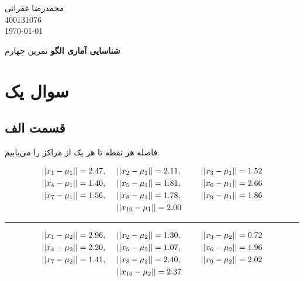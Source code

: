 \documentclass[12pt, a4paper]{article}
\newcommand{\coursetitle}{شناسایی آماری الگو}
\newcommand{\doctitle}{تمرین چهارم}
\newcommand{\name}{محمدرضا غفرانی}
\newcommand{\studentno}{400131076}
\newcommand{\todaydate}{\today}
\begin{document}
\begin{flushleft}
    \name \\
    \studentno \\
    \todaydate
\end{flushleft}

\begin{center}
    \huge
    \textbf{\coursetitle}
    \break
    \large
    \doctitle
\end{center}

\thispagestyle{plain}

\noindent

\section*{سوال یک}

\subsection*{قسمت الف}

فاصله هر نقطه تا هر یک از مراکز را می‌یابیم.

\begin{eqnarray*}
    ||x_1 - \mu_1|| = 2.47, & \hspace{.5cm} ||x_2 - \mu_1|| = 2.11, & \hspace{.5cm} ||x_3 - \mu_1|| = 1.52 \\
    ||x_4 - \mu_1|| = 1.40, & \hspace{.5cm} ||x_5 - \mu_1|| = 1.81, & \hspace{.5cm} ||x_6 - \mu_1|| = 2.66 \\
    ||x_7 - \mu_1|| = 1.56, & \hspace{.5cm} ||x_8 - \mu_1|| = 1.78, & \hspace{.5cm} ||x_9 - \mu_1|| = 1.86 \\
    & \hspace{.5cm} ||x_{10} - \mu_1|| = 2.00 &
\end{eqnarray*}

\begin{center}
    \rule{0.3\linewidth}{0.5pt}
\end{center}

\begin{eqnarray*}
    ||x_1 - \mu_2|| = 2.96, & \hspace{.5cm} ||x_2 - \mu_2|| = 1.30, & \hspace{.5cm} ||x_3 - \mu_2|| = 0.72 \\
    ||x_4 - \mu_2|| = 2.20, & \hspace{.5cm} ||x_5 - \mu_2|| = 1.07, & \hspace{.5cm} ||x_6 - \mu_2|| = 1.96 \\
    ||x_7 - \mu_2|| = 1.41, & \hspace{.5cm} ||x_8 - \mu_2|| = 2.40, & \hspace{.5cm} ||x_9 - \mu_2|| = 2.02 \\
    & \hspace{.5cm} ||x_{10} - \mu_2|| = 2.37 &
\end{eqnarray*}
\end{document}
